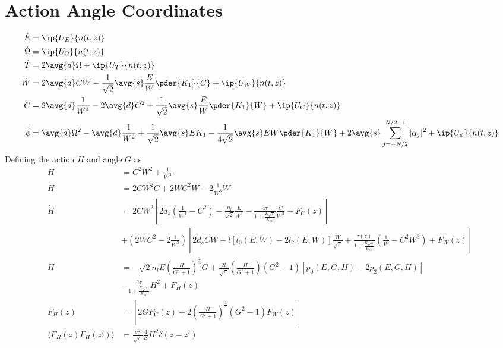 \section{Action Angle Coordinates}


\begin{equation}
\begin{split}
 \dot{E} &=  \ip{U_E}{n(t,z)} \\
 \dot{\Omega} & =   \ip{U_\Omega}{n(t,z)} \\
 \dot{T} &=  2\avg{d} \Omega + \ip{ U_T }{ n(t,z)} \\
 \dot{W} &=  2 \avg{d} C W - \frac{1}{\sqrt{2}} \avg{s} \frac{E}{W} \pder{K_1}{C} + \ip{U_W}{ n(t,z)}\\ 
\dot{C} &= 2 \avg{d} \frac{1}{W^4}  - 2 \avg{d} C^2 + \frac{1}{\sqrt{2}}\avg{s} \frac{E}{W} \pder{K_1}{W} + \ip{U_C}{ n(t,z)}\\
\dot{\phi} &= \avg{d} \Omega^2 - \avg{d} \frac{1}{W^2} + \frac{1}{\sqrt{2}} \avg{s} E K_1 - \frac{1}{4\sqrt{2}} \avg{s} EW \pder{K_1}{W} + 2\avg{s}  \sum_{j=-N/2}^{N/2 - 1} |\alpha_j|^2 + \ip{U_{\phi}}{n(t,z)} \\
\end{split}
\end{equation}
Defining the action $H$ and angle $G$ as
\begin{equation}
\begin{split}
H &= C^2 W^2 + \frac{1}{W^2}\\
\dot{H} &= 2CW^2 \dot{C} + 2WC^2 \dot{W} - 2\frac{1}{W^3}\dot{W}\\
\dot{H} &= 2CW^2 \left[2d_{s} \left(\frac{1}{W^4}-C^2\right)-\frac{n_{l}}{\sqrt{2}}  \frac{E}{W^3} - \frac{4\tau}{1+\frac{E \sqrt{\pi}}{E_{sat}}} \frac{C}{W^2} + F_C(z)\right] \\ 
        &  + \left(2WC^2 - 2\frac{1}{W^3} \right)\left[ 2d_{s} C W + l \left[l_0(E,W) - 2l_2(E,W)\right] \frac{W}{\sqrt{\pi}} +  \frac{\tau(z)}{1+\frac{E \sqrt{\pi}}{E_{sat}}} \left(\frac{1}{W} - C^2W^3\right) + F_W(z)\right] \\ 
\dot{H} &= -\sqrt{2}n_{l}E \left(\frac{H}{G^2+1}\right)^{\frac{2}{3}} G + \frac{2l}{\sqrt{\pi}} \left(\frac{H}{G^2+1}\right) \left(G^2-1\right)\left[p_0(E,G,H) - 2p_2(E,G,H)\right] \\
        &  - \frac{2\tau}{1+\frac{E \sqrt{\pi}}{E_{sat}}} H^2 + F_H(z) \\
        F_H(z) &= \left[ 2G F_C(z) + 2\left(\frac{H}{G^2+1}\right)^{\frac{3}{2}} (G^2-1) F_W(z) \right] \\ 
        \langle F_H(z) F_H(z') \rangle &= \frac{\sigma^2}{\sqrt{\pi}} \frac{4}{E}H^2 \delta(z-z') \\ 
\end{split}
\end{equation}

